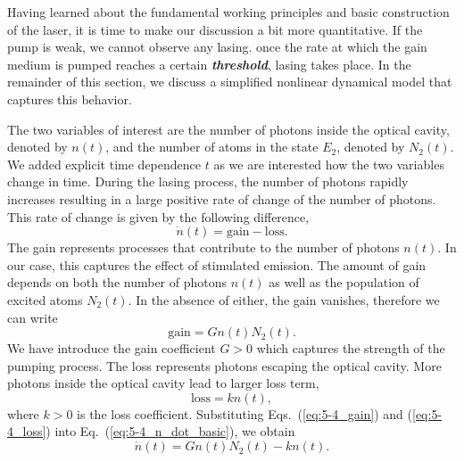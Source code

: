 Having learned about the fundamental working principles and basic construction of the laser, it is time to make our discussion a bit more quantitative.
If the pump is weak, we cannot observe any lasing.
once the rate at which the gain medium is pumped reaches a certain \textit{\textbf{threshold}}, lasing takes place.
In the remainder of this section, we discuss a simplified nonlinear dynamical model that captures this behavior.

The two variables of interest are the number of photons inside the optical cavity, denoted by $n(t)$, and the number of atoms in the state $E_2$, denoted by $N_2(t)$.
We added explicit time dependence $t$ as we are interested how the two variables change in time.
During the lasing process, the number of photons rapidly increases resulting in a large positive rate of change of the number of photons.
This rate of change is given by the following difference,
\begin{equation}
    \dot{n}(t) = \text{gain} - \text{loss}.
    \label{eq:5-4_n_dot_basic}
\end{equation}
The gain represents processes that contribute to the number of photons $n(t)$.
In our case, this captures the effect of stimulated emission.
The amount of gain depends on both the number of photons $n(t)$ as well as the population of excited atoms $N_2(t)$.
In the absence of either, the gain vanishes, therefore we can write
\begin{equation}
    \text{gain} = G n (t) N_2(t).
    \label{eq:5-4_gain}
\end{equation}
We have introduce the gain coefficient $G>0$ which captures the strength of the pumping process.
The loss represents photons escaping the optical cavity.
More photons inside the optical cavity lead to larger loss term,
\begin{equation}
    \text{loss} = k n(t),
    \label{eq:5-4_loss}
\end{equation}
where $k>0$ is the loss coefficient.
Substituting Eqs.~(\ref{eq:5-4_gain}) and (\ref{eq:5-4_loss}) into Eq.~(\ref{eq:5-4_n_dot_basic}), we obtain
\begin{equation}
    \dot{n}(t) = G n(t) N_2(t) - k n(t).
    \label{eq:5-4_n_dot_detailed}
\end{equation}

